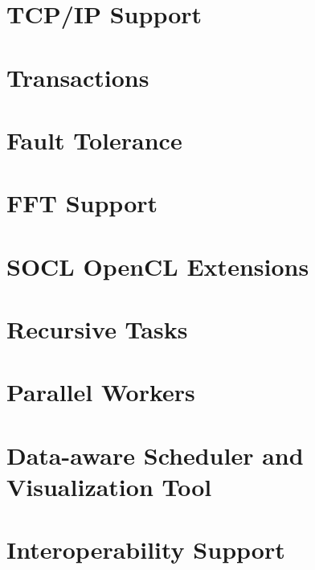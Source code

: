 \chapter{TCP/IP Support}
\label{TCPIPSupport}
\hypertarget{TCPIPSupport}{}


\chapter{Transactions}
\label{Transactions}
\hypertarget{Transactions}{}


\chapter{Fault Tolerance}
\label{FaultTolerance}
\hypertarget{FaultTolerance}{}


\chapter{FFT Support}
\label{FFTSupport}
\hypertarget{FFTSupport}{}


\chapter{SOCL OpenCL Extensions}
\label{SOCLOpenclExtensions}
\hypertarget{SOCLOpenclExtensions}{}


\chapter{Recursive Tasks}
\label{RecursiveTasks}
\hypertarget{RecursiveTasks}{}


\chapter{Parallel Workers}
\label{ParallelWorker}
\hypertarget{ParallelWorker}{}


\chapter{Data-aware Scheduler and Visualization Tool}
\label{Darts}
\hypertarget{Darts}{}


\chapter{Interoperability Support}
\label{InteropSupport}
\hypertarget{InteropSupport}{}


